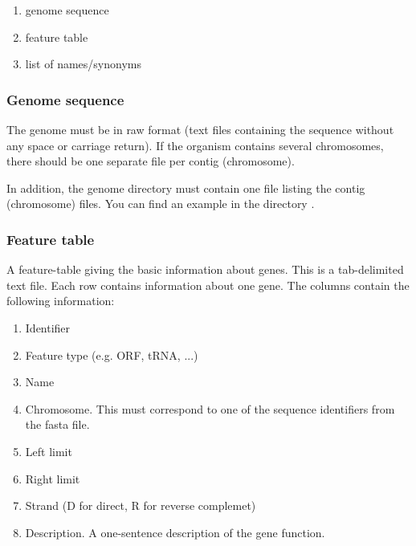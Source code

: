 \begin{enumerate}
\item genome sequence
\item feature table
\item list of names/synonyms
\end{enumerate}

\subsubsection{Genome sequence} 

The genome must be in raw format (text files containing the sequence
without any space or carriage return). If the organism contains
several chromosomes, there should be one separate file per contig
(chromosome). 

In addition, the genome directory must contain one file listing the
contig (chromosome) files. You can find an example in the directory
.


\subsubsection{Feature table}

A feature-table giving the basic information about genes. This is
a tab-delimited text file. Each row contains information about one
gene. The columns contain the following information: 
\begin{enumerate}

\item Identifier

\item Feature type (e.g. ORF, tRNA, ...)

\item Name

\item Chromosome. This must correspond to one of the sequence
identifiers from the fasta file.

\item Left limit

\item Right limit

\item Strand (D for direct, R for reverse complemet)

\item Description. A one-sentence description of the gene function.

\end{enumerate}

